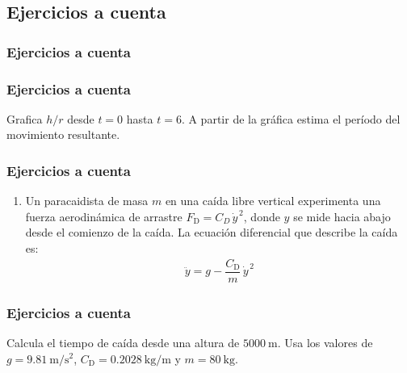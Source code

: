 \documentclass[12pt]{beamer}
\begin{document}
\subsection*{Ejercicios a cuenta}

\begin{frame}
\frametitle{Ejercicios a cuenta}
\begin{figure}[H]
\centering
{}
\end{figure}
\end{frame}
\begin{frame}
\frametitle{Ejercicios a cuenta}
Grafica $h/r$ desde $t = 0$ hasta $t = 6$. A partir de la gráfica estima el período del movimiento resultante.
\end{frame}
\begin{frame}
\frametitle{Ejercicios a cuenta}
\begin{enumerate}
\conti
\item Un paracaidista de masa $m$ en una caída libre vertical experimenta una fuerza aerodinámica de arrastre $F_{\text{D}} = C_{D} \, \dot{y}^{\, 2}$, donde $y$ se mide hacia abajo desde el comienzo de la caída. La ecuación diferencial que describe la caída es:
\begin{align*}
\ddot{y} = g - \dfrac{C_{\text{D}}}{m} \, \dot{y}^{\, 2}
\end{align*}
\end{enumerate}
\end{frame}
\begin{frame}
\frametitle{Ejercicios a cuenta}
Calcula el tiempo de caída desde una altura de $\SI{5000}{\meter}$. Usa los valores de $g = \SI{9.81}{\meter\per\square\second}$, $C_{\text{D}} = \SI{0.2028 }{\kilo\gram\per\metre}$ y $m = \SI{80}{\kilo\gram}$.
\end{frame}
\end{document}
